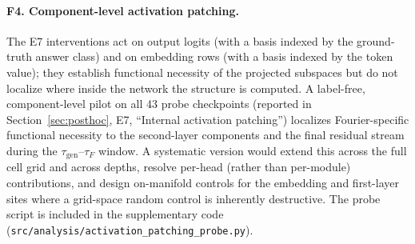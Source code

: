 \documentclass{article}
\newcommand{\taug}{\tau_{\mathrm{gen}}}
\newcommand{\tauf}{\tau_{F}}
\begin{document}
\paragraph{F4. Component-level activation patching.}
The E7 interventions act on output logits (with a basis indexed by
the ground-truth answer class) and on embedding rows (with a basis
indexed by the token value); they establish functional necessity
of the projected subspaces but do not localize where inside the
network the structure is computed.
A label-free, component-level pilot on all 43 probe checkpoints
(reported in Section~\ref{sec:posthoc}, E7, ``Internal activation
patching'') localizes Fourier-specific functional necessity to the
second-layer components and the final residual stream during the
$\taug$--$\tauf$ window.
A systematic version would extend this across the full cell grid
and across depths, resolve per-head (rather than per-module)
contributions, and design on-manifold controls for the embedding
and first-layer sites where a grid-space random control is
inherently destructive.
The probe script is included in the supplementary code
(\texttt{src/analysis/activation\_patching\_probe.py}).
\end{document}
